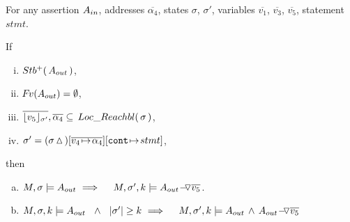 \begin{lemma}
\label{l:calls:return:ext}

For any  assertion $\Ain$, addresses $\overline {\alpha_4}$, states $\sigma$, $\sigma'$,  
variables  $\overline{v_1}$,      $\overline{v_3}$,   $\overline{v_5}$,  %
statement $stmt$.

\noindent
 If 
 
\begin{enumerate}[(i)]
\item 
$ \Pos \Aout$,  
\item 
 $\fv(\Aout) = \emptyset$,
\item
$  \overline {\interpret {\sigma'} {v_5}}, \overline {\alpha_4} \subseteq \LRelevantO \sigma $,
 \item
$\sigma'= (\sigma \popSymbol)[\overline{ v_4\! \mapsto\! \alpha_4}][\prg{cont}\!\mapsto\! stmt]
$, 
  \end{enumerate}
  
\noindent
then


\begin{enumerate}[a.]
\item
 \label{l:ext:return:one}
 $M, \sigma \models  {\Aout}\  
 \hfill \Longrightarrow  \ \ \  \  \satDAssertFrom M  {\sigma'} k  {\PushASLong  {\overline {v_5}}    {\Aout}}$.

\item
\label{l:ext:return:two}
$\satDAssertFrom M  \sigma k   \Aout  \ \  \wedge\ \ \DepthSt {\sigma'} \geq k  \ 
 \hfill \Longrightarrow  \ \ \  \   \satDAssertFrom M  {\sigma'} k   {\Aout \, \wedge\, {\PushASLong  {\overline {v_5}}    {\Aout}}} $

 
\end{enumerate}

\end{lemma}


